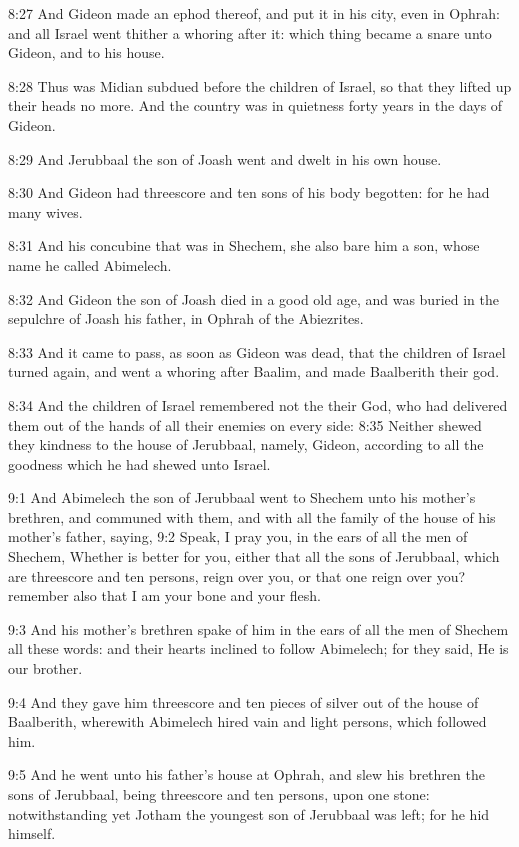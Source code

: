 8:27 And Gideon made an ephod thereof, and put it in his city, even in
Ophrah: and all Israel went thither a whoring after it: which thing
became a snare unto Gideon, and to his house.

8:28 Thus was Midian subdued before the children of Israel, so that
they lifted up their heads no more. And the country was in quietness
forty years in the days of Gideon.

8:29 And Jerubbaal the son of Joash went and dwelt in his own house.

8:30 And Gideon had threescore and ten sons of his body begotten: for
he had many wives.

8:31 And his concubine that was in Shechem, she also bare him a son,
whose name he called Abimelech.

8:32 And Gideon the son of Joash died in a good old age, and was
buried in the sepulchre of Joash his father, in Ophrah of the
Abiezrites.

8:33 And it came to pass, as soon as Gideon was dead, that the
children of Israel turned again, and went a whoring after Baalim, and
made Baalberith their god.

8:34 And the children of Israel remembered not the \LORD their God, who
had delivered them out of the hands of all their enemies on every
side: 8:35 Neither shewed they kindness to the house of Jerubbaal,
namely, Gideon, according to all the goodness which he had shewed unto
Israel.

9:1 And Abimelech the son of Jerubbaal went to Shechem unto his
mother's brethren, and communed with them, and with all the family of
the house of his mother's father, saying, 9:2 Speak, I pray you, in
the ears of all the men of Shechem, Whether is better for you, either
that all the sons of Jerubbaal, which are threescore and ten persons,
reign over you, or that one reign over you? remember also that I am
your bone and your flesh.

9:3 And his mother's brethren spake of him in the ears of all the men
of Shechem all these words: and their hearts inclined to follow
Abimelech; for they said, He is our brother.

9:4 And they gave him threescore and ten pieces of silver out of the
house of Baalberith, wherewith Abimelech hired vain and light persons,
which followed him.

9:5 And he went unto his father's house at Ophrah, and slew his
brethren the sons of Jerubbaal, being threescore and ten persons, upon
one stone: notwithstanding yet Jotham the youngest son of Jerubbaal
was left; for he hid himself.

